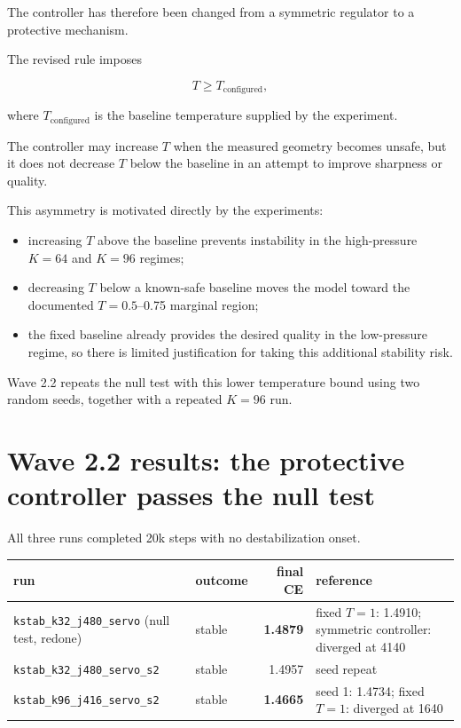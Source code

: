 \documentclass[11pt,a4paper]{article}
\newcommand{\code}[1]{\texttt{#1}}
\begin{document}
The controller has therefore been changed from a symmetric regulator to a
protective mechanism.

The revised rule imposes

\[
T
\ge
T_{\mathrm{configured}},
\]

where \(T_{\mathrm{configured}}\) is the baseline temperature supplied by the
experiment.

The controller may increase \(T\) when the measured geometry becomes unsafe,
but it does not decrease \(T\) below the baseline in an attempt to improve
sharpness or quality.

This asymmetry is motivated directly by the experiments:

\begin{itemize}[leftmargin=1.4em]

\item increasing \(T\) above the baseline prevents instability in the
high-pressure \(K=64\) and \(K=96\) regimes;

\item decreasing \(T\) below a known-safe baseline moves the model toward the
documented \(T=0.5\)--0.75 marginal region;

\item the fixed baseline already provides the desired quality in the
low-pressure regime, so there is limited justification for taking this
additional stability risk.
\end{itemize}

Wave 2.2 repeats the null test with this lower temperature bound using two
random seeds, together with a repeated \(K=96\) run.

\section{Wave 2.2 results: the protective controller passes the null test}

All three runs completed 20k steps with no destabilization onset.

\begin{center}\small
\begin{tabular}{p{4.6cm}p{3.0cm}rp{4.2cm}}
\toprule
run & outcome & final CE & reference \\
\midrule

\code{kstab\_k32\_j480\_servo} (null test, redone)
&
stable
&
\textbf{1.4879}
&
fixed \(T=1\): 1.4910;
symmetric controller: diverged at 4140
\\

\code{kstab\_k32\_j480\_servo\_s2}
&
stable
&
1.4957
&
seed repeat
\\

\code{kstab\_k96\_j416\_servo\_s2}
&
stable
&
\textbf{1.4665}
&
seed 1: 1.4734;
fixed \(T=1\): diverged at 1640
\\

\bottomrule
\end{tabular}
\end{center}
\end{document}
